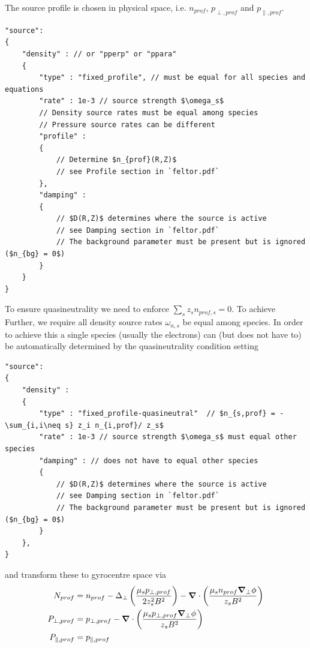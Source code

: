 The source profile is chosen in physical space, i.e. $n_{prof}$, $p_{\perp,prof}$ and $p_{\parallel,prof}$.
\begin{verbatim}
"source":
{
    "density" : // or "pperp" or "ppara"
    {
        "type" : "fixed_profile", // must be equal for all species and equations
        "rate" : 1e-3 // source strength $\omega_s$
        // Density source rates must be equal among species
        // Pressure source rates can be different
        "profile" :
        {
            // Determine $n_{prof}(R,Z)$
            // see Profile section in `feltor.pdf`
        },
        "damping" :
        {
            // $D(R,Z)$ determines where the source is active
            // see Damping section in `feltor.pdf`
            // The background parameter must be present but is ignored ($n_{bg} = 0$)
        }
    }
}
\end{verbatim}
To ensure quasineutrality we need to enforce $\sum_s z_s n_{prof,s} = 0$. To achieve
Further, we require all density source rates $\omega_{n,s}$ be equal among species.
In order to achieve this a single species (usually the electrons) can (but does
not have to) be automatically determined by the quasineutrality condition setting
\begin{verbatim}
"source":
{
    "density" :
    {
        "type" : "fixed_profile-quasineutral"  // $n_{s,prof} = -\sum_{i,i\neq s} z_i n_{i,prof}/ z_s$
        "rate" : 1e-3 // source strength $\omega_s$ must equal other species
        "damping" : // does not have to equal other species
        {
            // $D(R,Z)$ determines where the source is active
            // see Damping section in `feltor.pdf`
            // The background parameter must be present but is ignored ($n_{bg} = 0$)
        }
    },
}
\end{verbatim}
and transform these to gyrocentre space via
\begin{align}
   N_{prof} &= n_{prof} - \Delta_\perp \left( \frac{\mu_s p_{\perp,prof}}{2z_s^2B^2}\right) - {\boldsymbol{\nabla}}\cdot\left( \frac{\mu_s n_{prof} {\boldsymbol{\nabla}}_\perp \phi}{z_sB^2}\right) \\
   P_{\perp,prof} &= p_{\perp,prof} - {\boldsymbol{\nabla}}\cdot\left( \frac{\mu_s p_{\perp,prof}{\boldsymbol{\nabla}}_\perp \phi}{z_sB^2}\right) \\
   P_{\parallel,prof} &= p_{\parallel,prof}
\end{align}


